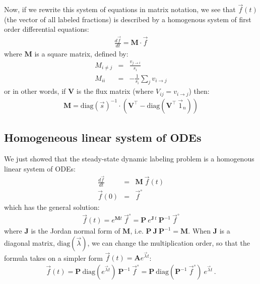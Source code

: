 \documentclass{article}
\newcommand{\finit}{\ensuremath{\vec{f}^\circ}}
\newcommand{\flux}[2]{\ensuremath{v_{{#1} \rightarrow {#2}}}}
\begin{document}
Now, if we rewrite this system of equations in matrix notation, we see that $\vec{f}(t)$ (the vector of all labeled fractions) is described by a homogenous system of first order differential equations:
\begin{eqnarray}\label{eq:homogenous}
    \frac{d\vec{f}}{d t} = \mathbf{M} \cdot \vec{f}
\end{eqnarray}
where $\mathbf{M}$ is a square matrix, defined by:
\begin{eqnarray}
    M_{i \neq j} &=& \frac{\flux{j}{i}}{s_i}\\
    M_{ii} &=& -\frac{1}{s_i}\sum_{j} \flux{i}{j}
\end{eqnarray}
or in other words, if $\mathbf{V}$ is the flux matrix (where $V_{ij} = \flux{i}{j}$) then:
\begin{eqnarray}
    \mathbf{M} = \text{diag}(\vec{s})^{-1} \cdot \left( \mathbf{V}^\top - \text{diag}(\mathbf{V}^\top~\vec{1}_n) \right)
\end{eqnarray}

\subsection{Homogeneous linear system of ODEs}
We just showed that the steady-state dynamic labeling problem is a homogenous linear system of ODEs:
\begin{eqnarray}
    \frac{d\vec{f}}{d t} &=& \mathbf{M} ~ \vec{f}(t) \\
    \vec{f}(0) &=& \finit
\end{eqnarray}
which has the general solution:
\begin{eqnarray}
    \vec{f}(t) = e^{\mathbf{M} t}~\finit =  \mathbf{P}~e^{\mathbf{J}\,t}~\mathbf{P}^{-1}~\finit
\end{eqnarray}
where $\mathbf{J}$ is the Jordan normal form of $\mathbf{M}$, i.e. $\mathbf{P}~\mathbf{J}~\mathbf{P}^{-1} = \mathbf{M}$. When $\mathbf{J}$ is a diagonal matrix, $\text{diag}(\vec{\lambda})$, we can change the multiplication order, so that the formula takes on a simpler form $\vec{f}(t) = \mathbf{A} e^{\vec{\lambda} t}$:
\begin{eqnarray}\label{eq:homogenous_solution}
    \vec{f}(t) = \mathbf{P}~ \text{diag}\left(e^{\vec{\lambda} t}\right) ~\mathbf{P}^{-1}~\finit = \mathbf{P}~\text{diag}\left( \mathbf{P}^{-1} ~\finit\right)~ e^{\vec{\lambda} t}\,.
\end{eqnarray}
\end{document}
